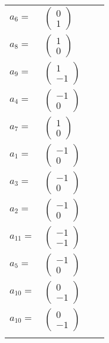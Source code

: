 \documentclass[1p]{elsarticle_modified}
\theoremstyle{definition}
\begin{document}
\begin{tabular}{m{7pt} m{180pt} m{7pt} m{180pt} }
\flushright $a_{6}=$&$\begin{pmatrix}0\\1\end{pmatrix}$ \\
\flushright $a_{8}=$&$\begin{pmatrix}1\\0\end{pmatrix}$ \\
\flushright $a_{9}=$&$\begin{pmatrix}1\\-1\end{pmatrix}$ \\
\flushright $a_{4}=$&$\begin{pmatrix}-1\\0\end{pmatrix}$ \\
\flushright $a_{7}=$&$\begin{pmatrix}1\\0\end{pmatrix}$ \\
\flushright $a_{1}=$&$\begin{pmatrix}-1\\0\end{pmatrix}$ \\
\flushright $a_{3}=$&$\begin{pmatrix}-1\\0\end{pmatrix}$ \\
\flushright $a_{2}=$&$\begin{pmatrix}-1\\0\end{pmatrix}$ \\
\flushright $a_{11}=$&$\begin{pmatrix}-1\\-1\end{pmatrix}$ \\
\flushright $a_{5}=$&$\begin{pmatrix}-1\\0\end{pmatrix}$ \\
\flushright $a_{10}=$&$\begin{pmatrix}0\\-1\end{pmatrix}$\\ \flushright $a_{10}=$&$\begin{pmatrix}0\\-1\end{pmatrix}$\\&\end{tabular}
\end{document}

